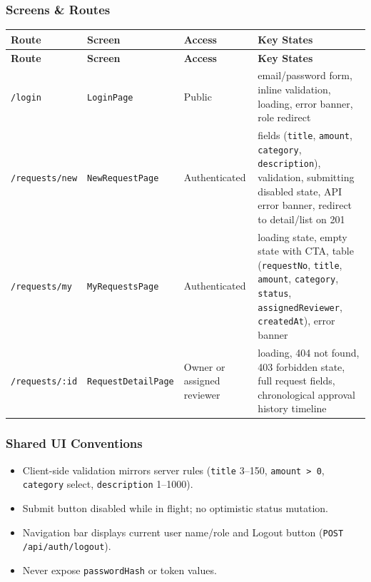 \documentclass[11pt,a4paper]{article}
\begin{document}
\subsubsection{Screens \& Routes}
\vspace{0.3em}
\begin{longtable}{|>{\RaggedRight}p{4.2cm}|>{\RaggedRight}p{3.2cm}|>{\centering\arraybackslash}p{2.0cm}|>{\RaggedRight}p{5.3cm}|}
\hline
\rowcolor{zenPale}\textbf{Route} & \textbf{Screen} & \textbf{Access} & \textbf{Key States} \\ \hline
\endfirsthead
\hline
\rowcolor{zenPale}\textbf{Route} & \textbf{Screen} & \textbf{Access} & \textbf{Key States} \\ \hline
\endhead
\hline
\endfoot
\texttt{/\allowbreak login} & \texttt{LoginPage} & Public & email/password form, inline validation, loading, error banner, role redirect \\ \hline
\texttt{/\allowbreak requests/\allowbreak new} & \texttt{NewRequestPage} & Authenticated & fields (\texttt{title}, \texttt{amount}, \texttt{category}, \texttt{description}), validation, submitting disabled state, API error banner, redirect to detail/list on 201 \\ \hline
\texttt{/\allowbreak requests/\allowbreak my} & \texttt{MyRequestsPage} & Authenticated & loading state, empty state with CTA, table (\texttt{requestNo}, \texttt{title}, \texttt{amount}, \texttt{category}, \texttt{status}, \texttt{assignedReviewer}, \texttt{createdAt}), error banner \\ \hline
\texttt{/\allowbreak requests/\allowbreak :\allowbreak id} & \texttt{RequestDetailPage} & Owner or assigned reviewer & loading, 404 not found, 403 forbidden state, full request fields, chronological approval history timeline \\ \hline
\end{longtable}
\vspace{0.3em}

\subsubsection{Shared UI Conventions}
\begin{itemize}[leftmargin=*,itemsep=2pt,topsep=2pt]
  \item Client-side validation mirrors server rules (\texttt{title} 3–150, \texttt{amount > 0}, \texttt{category} select, \texttt{description} 1–1000).
  \item Submit button disabled while in flight; no optimistic status mutation.
  \item Navigation bar displays current user name/role and Logout button (\texttt{POST /api/auth/logout}).
  \item Never expose \texttt{passwordHash} or token values.
\end{itemize}
\end{document}

